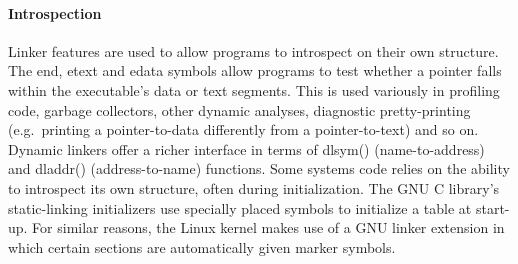 \paragraph{Introspection}
Linker features are used to allow programs to introspect on their own structure.
The \textsf{end}, \textsf{etext} and \textsf{edata} symbols 
allow programs to test whether a pointer falls within the 
executable's data or text segments. 
This is used variously in profiling code, garbage collectors,
other dynamic analyses, diagnostic pretty-printing 
(e.g.\ printing a pointer-to-data differently from a pointer-to-text)
and so on.
Dynamic linkers offer a richer interface 
in terms of \textsf{dlsym()} (name-to-address) and \textsf{dladdr()} (address-to-name) functions.
Some systems code relies on the ability to introspect its own structure,
often during initialization.
The GNU C library's static-linking initializers 
use specially placed symbols to initialize a table 
at start-up.
For similar reasons, the Linux kernel 
makes use of a GNU linker extension in which 
certain sections 
are automatically given 
marker symbols.


%
%

